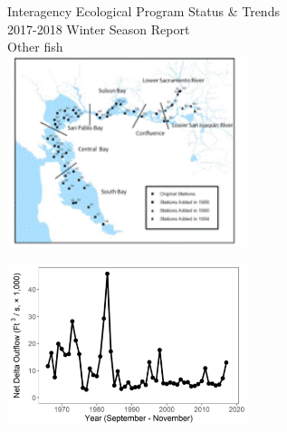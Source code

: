 \documentclass[]{article}\usepackage[]{graphicx}\usepackage[]{color}
\begin{document}
\newpage


\begin{Row}
  \begin{Cell}{7}
    \vspace{0.2cm}
    \begin{center}
      \doublespacing
      {\Large Interagency Ecological Program Status \& Trends } \\
      \vspace{0.2cm}
      {\Large 2017-2018 Winter Season Report} \\
      \vspace{0.5cm}
      {\Huge Other fish} \\
      \vspace{0.3cm}
      \includegraphics[width=7cm,align=m]{figures/smelt/map.png}
    \end{center}
  \end{Cell}
  \begin{Cell}{6}
    \vspace{0.2cm}
    \begin{center}
      \includegraphics[width=7cm,trim=0 0 0 0,clip,align=m]{figures/outflow_tmp.png}
    \end{center}
  \end{Cell}
\end{Row}

\vspace{0.5cm}
\end{document}
